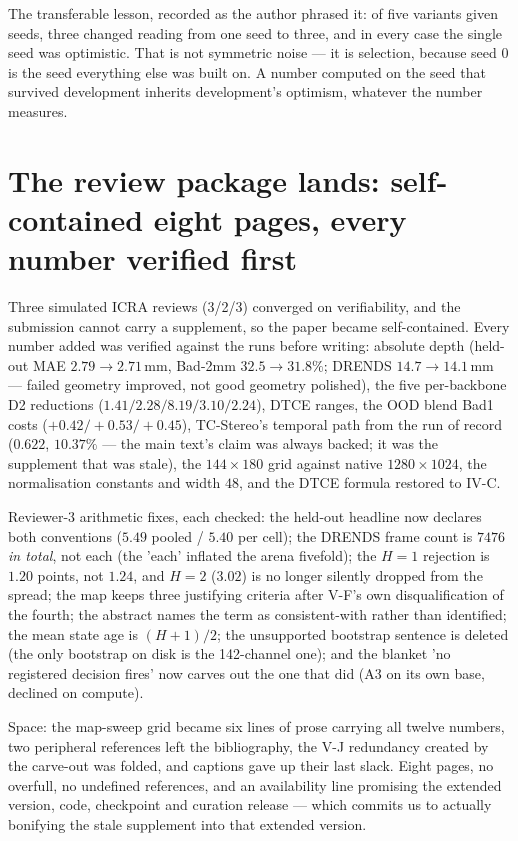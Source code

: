 \documentclass[11pt,a4paper]{article}
\begin{document}
The transferable lesson, recorded as the author phrased it: of five variants
given seeds, three changed reading from one seed to three, and in every case
the single seed was optimistic. That is not symmetric noise --- it is
selection, because seed $0$ is the seed everything else was built on. A
number computed on the seed that survived development inherits development's
optimism, whatever the number measures.



\section*{The review package lands: self-contained eight pages, every number verified first}

Three simulated ICRA reviews (3/2/3) converged on verifiability, and the
submission cannot carry a supplement, so the paper became self-contained.
Every number added was verified against the runs before writing: absolute
depth (held-out MAE $2.79\to2.71$\,mm, Bad-2mm $32.5\to31.8\%$; DRENDS
$14.7\to14.1$\,mm --- failed geometry improved, not good geometry polished),
the five per-backbone D2 reductions ($1.41/2.28/8.19/3.10/2.24$), DTCE
ranges, the OOD blend Bad1 costs ($+0.42/+0.53/+0.45$), TC-Stereo's temporal
path from the run of record ($0.622$, $10.37\%$ --- the main text's claim
was always backed; it was the supplement that was stale), the $144\times180$
grid against native $1280\times1024$, the normalisation constants and width
$48$, and the DTCE formula restored to IV-C.

Reviewer-3 arithmetic fixes, each checked: the held-out headline now
declares both conventions ($5.49$ pooled / $5.40$ per cell); the DRENDS
frame count is $7476$ \emph{in total}, not each (the 'each' inflated the
arena fivefold); the $H{=}1$ rejection is $1.20$ points, not $1.24$, and
$H{=}2$ ($3.02$) is no longer silently dropped from the spread; the map
keeps three justifying criteria after V-F's own disqualification of the
fourth; the abstract names the term as consistent-with rather than
identified; the mean state age is $(H{+}1)/2$; the unsupported bootstrap
sentence is deleted (the only bootstrap on disk is the 142-channel one);
and the blanket 'no registered decision fires' now carves out the one that
did (A3 on its own base, declined on compute).

Space: the map-sweep grid became six lines of prose carrying all twelve
numbers, two peripheral references left the bibliography, the V-J
redundancy created by the carve-out was folded, and captions gave up their
last slack. Eight pages, no overfull, no undefined references, and an
availability line promising the extended version, code, checkpoint and
curation release --- which commits us to actually bonifying the stale
supplement into that extended version.
\end{document}
